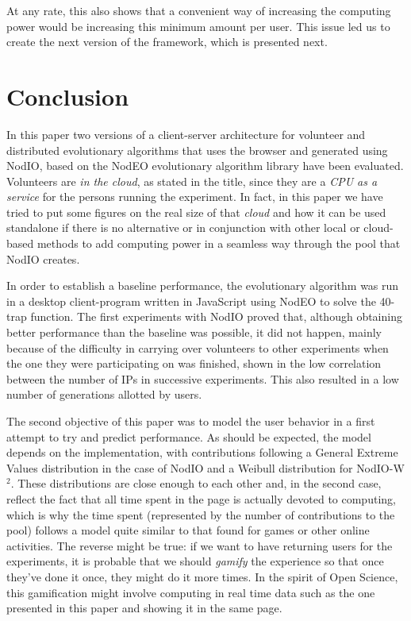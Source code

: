 \documentclass[letterpaper]{article}
\begin{document}
At any rate, this also shows that a convenient way of increasing the
computing power would be increasing this minimum amount per user. This
issue led us to create the next version of the framework, which is
presented next. %

\section{Conclusion}
\label{sec:conclusion}

In this paper two versions of a client-server architecture for volunteer and distributed
evolutionary algorithms that uses the browser and generated using {\sf
  NodIO}, based on the {\sf NodEO} evolutionary algorithm library have been
evaluated. Volunteers are {\em in the cloud}, as stated in the title,
since they are a {\em CPU as a service} for the persons running the
experiment. In fact, in this paper we have tried to put some figures
on the real size of that {\em cloud} and how it can be used standalone
if there is no alternative or in conjunction with other local or
cloud-based methods to add computing power in a seamless way through
the pool that NodIO creates. 

In order to establish a baseline performance, the evolutionary
algorithm was run in a desktop client-program written in JavaScript
using NodEO to solve the 40-trap function. The first experiments with
{\sf NodIO} proved that, although obtaining better performance than the
baseline was possible, it did not happen, mainly because of the
difficulty in carrying over volunteers to other experiments when the
one they were participating on was finished, shown in the low
correlation between the number of IPs in successive experiments. This
also resulted in a low number of generations allotted by users. 


The second objective of this paper was to model the user behavior in a
first attempt to try and predict performance. As should be expected,
the model depends on the implementation, with contributions following
a General Extreme Values distribution in the case of {\sf NodIO} and a
Weibull distribution for {\sf NodIO-W$^2$}. These distributions are
close enough to each other and, in the second case, reflect the fact
that all time spent in the page is actually devoted to computing,
which is why the time spent (represented by the number of
contributions to the pool) follows a model quite similar to that found
for games or other online activities. The reverse might be true: if we
want to have returning users for the experiments, it is probable that
we should {\em gamify} the experience so that once they've done it
once, they might do it more times. In the spirit of Open Science, this
gamification might involve computing in real time data such as the one
presented in this paper and showing it in the same page. 
\end{document}
